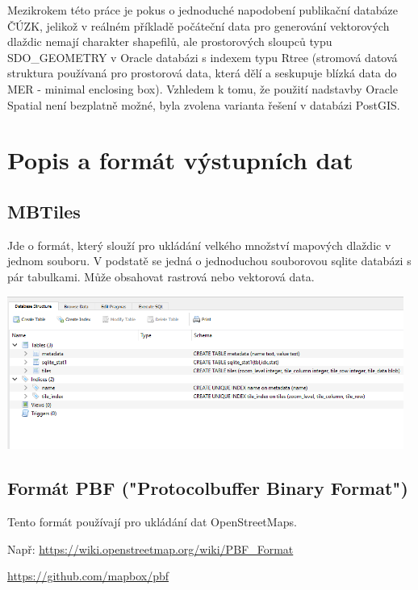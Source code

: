 \documentclass[12pt]{article}
\begin{document}
\indent Mezikrokem této práce je pokus o jednoduché napodobení publikační databáze ČÚZK, jelikož v reálném příkladě počáteční data pro generování vektorových dlaždic nemají charakter shapefilů, ale prostorových sloupců typu SDO\_GEOMETRY v Oracle databázi s indexem typu Rtree  (stromová datová struktura používaná pro prostorová data, která dělí a seskupuje blízká data do MER - minimal enclosing box). Vzhledem k tomu, že použití nadstavby Oracle Spatial není bezplatně možné, byla zvolena varianta řešení v databázi PostGIS.



\clearpage 
\section{Popis a formát výstupních dat}

\subsection{MBTiles}
Jde o formát, který slouží pro ukládání velkého množství mapových dlaždic v jednom souboru. V podstatě se jedná o jednoduchou souborovou sqlite databázi s pár tabulkami. Může obsahovat rastrová nebo vektorová data.

\begin{center}
	\includegraphics[width=13cm]{./img/mbtiles_db_structure.png}
\end{center}

\subsection{Formát PBF ("Protocolbuffer Binary Format")}
Tento formát používají pro ukládání dat OpenStreetMaps.

Např: \url{https://wiki.openstreetmap.org/wiki/PBF_Format}

\url{https://github.com/mapbox/pbf}
\end{document}

